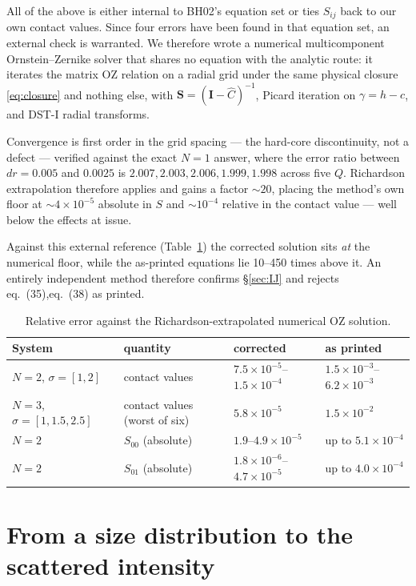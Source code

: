 \documentclass[11pt,a4paper]{article}
\newcommand{\Shat}{\bm{S}}
\newcommand{\eqBH}[1]{eq.~(#1)}
\begin{document}
All of the above is either internal to BH02's equation set or ties $S_{ij}$
back to our own contact values. Since four errors have been found in that
equation set, an external check is warranted. We therefore wrote a numerical
multicomponent Ornstein--Zernike solver that shares no equation with the
analytic route: it iterates the matrix OZ relation on a radial grid under the
same physical closure \eqref{eq:closure} and nothing else, with
$\Shat=(\bm I-\hat C)^{-1}$, Picard iteration on $\gamma=h-c$, and DST-I radial
transforms.

Convergence is first order in the grid spacing --- the hard-core discontinuity,
not a defect --- verified against the exact $N=1$ answer, where the error ratio
between $dr=0.005$ and $0.0025$ is $2.007,2.003,2.006,1.999,1.998$ across five
$Q$. Richardson extrapolation therefore applies and gains a factor $\sim20$,
placing the method's own floor at $\sim4\times10^{-5}$ absolute in $S$ and
$\sim10^{-4}$ relative in the contact value --- well below the effects at
issue.

Against this external reference (Table~\ref{tab:ext}) the corrected solution
sits \emph{at} the numerical floor, while the as-printed equations lie
10--450 times above it. An entirely independent method therefore confirms
\S\ref{sec:IJ} and rejects \eqBH{35},\eqBH{38} as printed.

\begin{table}[htbp]
\centering\small
\caption{Relative error against the Richardson-extrapolated numerical OZ
solution.}
\label{tab:ext}
\begin{tabular}{@{}llll@{}}
\toprule
System & quantity & corrected & as printed\\
\midrule
$N=2$, $\sigma=[1,2]$ & contact values & $7.5\times10^{-5}$--$1.5\times10^{-4}$ & $1.5\times10^{-3}$--$6.2\times10^{-3}$\\
$N=3$, $\sigma=[1,1.5,2.5]$ & contact values (worst of six) & $5.8\times10^{-5}$ & $1.5\times10^{-2}$\\
$N=2$ & $S_{00}$ (absolute) & $1.9$--$4.9\times10^{-5}$ & up to $5.1\times10^{-4}$\\
$N=2$ & $S_{01}$ (absolute) & $1.8\times10^{-6}$--$4.7\times10^{-5}$ & up to $4.0\times10^{-4}$\\
\bottomrule
\end{tabular}
\end{table}

\section{From a size distribution to the scattered intensity}
\label{sec:sas}
\end{document}
